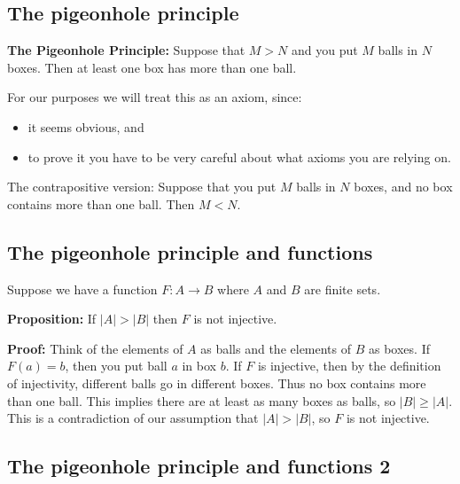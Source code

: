 \documentclass[
]{article}
\author{}
\date{}
\providecommand{\tightlist}{%
  \setlength{\itemsep}{0pt}\setlength{\parskip}{0pt}}
\begin{document}
\hypertarget{the-pigeonhole-principle}{%
\subsection{The pigeonhole principle}\label{the-pigeonhole-principle}}

\textbf{The Pigeonhole Principle:} Suppose that \(M>N\) and you put
\(M\) balls in \(N\) boxes. Then at least one box has more than one
ball.

For our purposes we will treat this as an axiom, since:

\begin{itemize}
\tightlist
\item
  it seems obvious, and
\item
  to prove it you have to be very careful about what axioms you are
  relying on.
\end{itemize}

The contrapositive version: Suppose that you put \(M\) balls in \(N\)
boxes, and no box contains more than one ball. Then \(M<N\).

\vfill\eject

\hypertarget{the-pigeonhole-principle-and-functions}{%
\subsection{The pigeonhole principle and
functions}\label{the-pigeonhole-principle-and-functions}}

Suppose we have a function \(F:A\to B\) where \(A\) and \(B\) are finite
sets.

\textbf{Proposition:} If \(|A|>|B|\) then \(F\) is not injective.

\textbf{Proof:} Think of the elements of \(A\) as balls and the elements
of \(B\) as boxes. If \(F(a)=b\), then you put ball \(a\) in box \(b\).
If \(F\) is injective, then by the definition of injectivity, different
balls go in different boxes. Thus no box contains more than one ball.
This implies there are at least as many boxes as balls, so
\(|B|\ge |A|\). This is a contradiction of our assumption that
\(|A|>|B|\), so \(F\) is not injective.

\vfill\eject

\hypertarget{the-pigeonhole-principle-and-functions-2}{%
\subsection{The pigeonhole principle and functions
2}\label{the-pigeonhole-principle-and-functions-2}}
\end{document}
